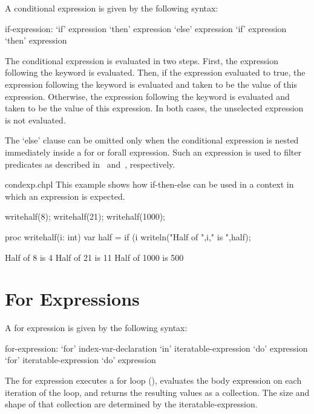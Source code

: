 A conditional expression is given by the following syntax:
\begin{syntax}
if-expression:
  `if' expression `then' expression `else' expression
  `if' expression `then' expression
\end{syntax}
The conditional expression is evaluated in two steps.  First, the
expression following the  keyword is evaluated.  Then, if the
expression evaluated to true, the expression following the 
keyword is evaluated and taken to be the value of this expression.
Otherwise, the expression following the  keyword is
evaluated and taken to be the value of this expression.  In both
cases, the unselected expression is not evaluated.

The `else' clause can be omitted only when the conditional expression
is nested immediately inside a for or forall expression.  Such an expression
is used to filter predicates as described
in~ and~,
respectively.

\begin{chapelexample}{condexp.chpl}
This example shows how if-then-else can be used in a context in which an
expression is expected.
\begin{chapel}
writehalf(8);
writehalf(21);
writehalf(1000);

proc writehalf(i: int) {
  var half = if (i %
  writeln("Half of ",i," is ",half); 
}
\end{chapel}
\begin{chapelprintoutput}
Half of 8 is 4
Half of 21 is 11
Half of 1000 is 500
\end{chapelprintoutput}
\end{chapelexample}

\section{For Expressions}
\label{For_Expressions}

A for expression is given by the following syntax:
\begin{syntax}
for-expression:
  `for' index-var-declaration `in' iteratable-expression `do' expression
  `for' iteratable-expression `do' expression
\end{syntax}
The for expression executes a for loop (),
evaluates the body expression on each iteration of the loop,
and returns the resulting values as a collection.
The size and shape of that collection
are determined by the iteratable-expression.

